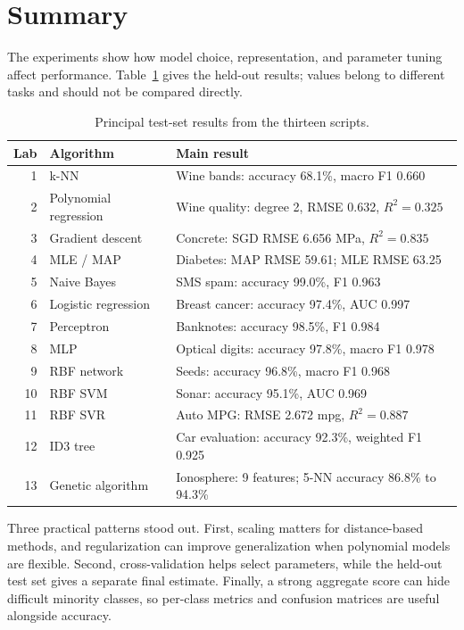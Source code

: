 \chapter*{Summary}

The experiments show how model choice, representation, and parameter tuning
affect performance. Table~\ref{tab:summary} gives the held-out results; values
belong to different tasks and should not be compared directly.

\begin{table}[H]
\centering\small
\caption{Principal test-set results from the thirteen scripts.}
\label{tab:summary}
\begin{tabularx}{\linewidth}{@{}r l X@{}}
\toprule
\textbf{Lab} & \textbf{Algorithm} & \textbf{Main result}\\
\midrule
1 & k-NN & Wine bands: accuracy 68.1\%, macro F1 0.660\\
2 & Polynomial regression & Wine quality: degree 2, RMSE 0.632, $R^2=0.325$\\
3 & Gradient descent & Concrete: SGD RMSE 6.656 MPa, $R^2=0.835$\\
4 & MLE / MAP & Diabetes: MAP RMSE 59.61; MLE RMSE 63.25\\
5 & Naive Bayes & SMS spam: accuracy 99.0\%, F1 0.963\\
6 & Logistic regression & Breast cancer: accuracy 97.4\%, AUC 0.997\\
7 & Perceptron & Banknotes: accuracy 98.5\%, F1 0.984\\
8 & MLP & Optical digits: accuracy 97.8\%, macro F1 0.978\\
9 & RBF network & Seeds: accuracy 96.8\%, macro F1 0.968\\
10 & RBF SVM & Sonar: accuracy 95.1\%, AUC 0.969\\
11 & RBF SVR & Auto MPG: RMSE 2.672 mpg, $R^2=0.887$\\
12 & ID3 tree & Car evaluation: accuracy 92.3\%, weighted F1 0.925\\
13 & Genetic algorithm & Ionosphere: 9 features; 5-NN accuracy 86.8\% to 94.3\%\\
\bottomrule
\end{tabularx}
\end{table}

Three practical patterns stood out. First, scaling matters for distance-based
methods, and regularization can improve generalization when polynomial models
are flexible. Second, cross-validation helps select parameters, while the
held-out test set gives a separate final estimate. Finally, a strong aggregate
score can hide difficult minority classes, so per-class metrics and confusion
matrices are useful alongside accuracy.

